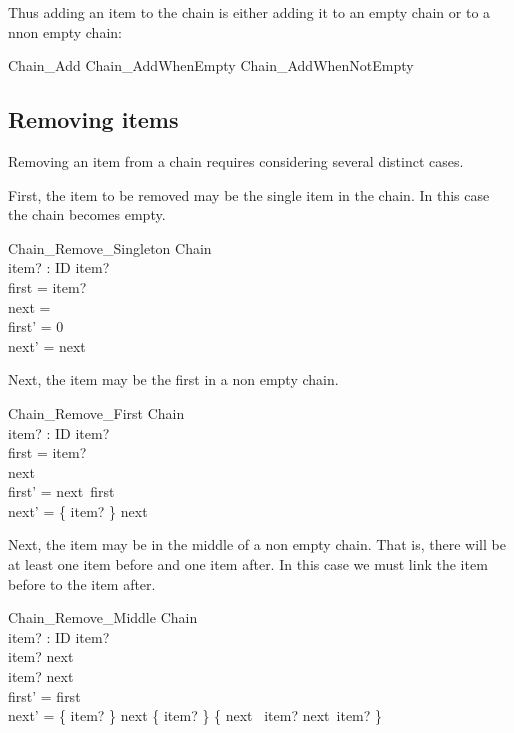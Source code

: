 \documentclass{article}
\begin{document}
Thus adding an item to the chain is either adding it to an empty chain or to a nnon empty chain:

\begin{zed}
Chain\_Add  Chain\_AddWhenEmpty \lor Chain\_AddWhenNotEmpty
\end{zed}

\subsection{Removing items}

Removing an item from a chain requires considering several distinct cases. 

First, the item to be removed may be the single item in the chain. In this case the chain becomes empty. 

\begin{schema}{Chain\_Remove\_Singleton}
	\Delta Chain \\
	item? : ID 
\where
	item?  \\
	first = item? \\
	next = \emptyset \\
	first' = 0 \\
	next' = next 
\end{schema}

Next, the item may be the first in a non empty chain.

\begin{schema}{Chain\_Remove\_First}
	\Delta Chain \\
	item? : ID 
\where
	item?  \\
	first = item? \\
	next \neq \emptyset \\
	first' = next~first \\
	next' = \{ item? \} \ndres next
\end{schema}

Next, the item may be in the middle of a non empty chain. That is,
there will be at least one item before and one item after. In this case
we must link the item before to the item after.  

\begin{schema}{Chain\_Remove\_Middle}
	\Delta Chain \\
	item? : ID
\where
	item?  \\
	item? \in \dom next \\
	item? \in \ran next \\

	first' = first \\
	next' = \{ item? \} \ndres next \nrres \{ item? \} \cup \{ next\inv ~ item? \mapsto next~item? \} 
\end{schema}
\end{document}

